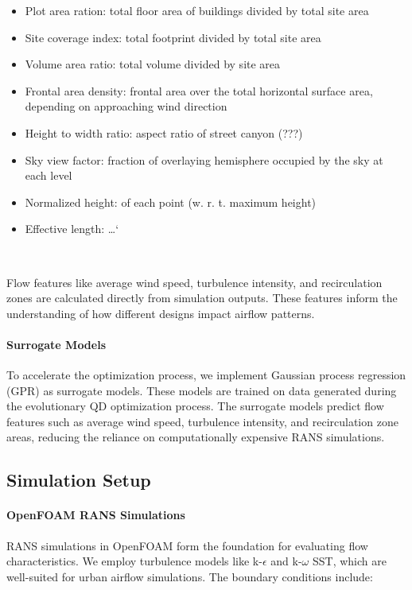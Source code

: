 \documentclass[times,final]{elsarticle}
\begin{document}
\begin{itemize}
	\item Plot area ration: total floor area of buildings divided by total site area
	\item Site coverage index: total footprint divided by total site area
	\item Volume area ratio: total volume divided by site area
	\item Frontal area density: frontal area over the total horizontal surface area, depending on approaching wind direction
	\item Height to width ratio: aspect ratio of street canyon (???)
	\item Sky view factor: fraction of overlaying hemisphere occupied by the sky at each level
	\item Normalized height: of each point (w. r. t. maximum height)
	\item Effective length: \dots`
\end{itemize}~\cite{javanroodi2022combining}

Flow features like average wind speed, turbulence intensity, and
recirculation zones are calculated directly from simulation outputs.
These features inform the understanding of how different designs impact
airflow patterns.


\paragraph{Surrogate Models}

To accelerate the optimization process, we implement Gaussian process
regression (GPR) as surrogate models. These models are trained on data
generated during the evolutionary QD optimization process. The surrogate
models predict flow features such as average wind speed, turbulence
intensity, and recirculation zone areas, reducing the reliance on
computationally expensive RANS simulations.


\subsection{Simulation Setup}


\paragraph{OpenFOAM RANS Simulations}

RANS simulations in OpenFOAM form the foundation for evaluating flow
characteristics. We employ turbulence models like k-$\epsilon$ and k-$\omega$ SST, which
are well-suited for urban airflow simulations. The boundary conditions
include:
\end{document}
